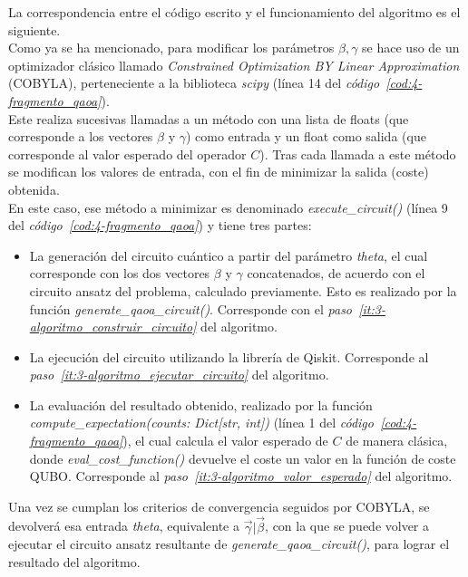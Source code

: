 La correspondencia entre el código escrito y el funcionamiento del algoritmo es el siguiente.
\\
Como ya se ha mencionado, para modificar los parámetros $\beta, \gamma$ se hace uso de un optimizador clásico llamado \textit{Constrained Optimization BY Linear Approximation} (COBYLA), perteneciente a la biblioteca \textit{scipy} (línea 14 del \textit{código~\ref{cod:4-fragmento_qaoa}}).
\\
Este realiza sucesivas llamadas a un método con una lista de floats (que corresponde a los vectores $\beta$ y $\gamma$) como entrada y un float como salida (que corresponde al valor esperado del operador $C$).
Tras cada llamada a este método se modifican los valores de entrada, con el fin de minimizar la salida (coste) obtenida.
\\
En este caso, ese método a minimizar es denominado \textit{execute\_circuit()} (línea 9 del \textit{código~\ref{cod:4-fragmento_qaoa}}) y tiene tres partes:

\begin{itemize}
\item La generación del circuito cuántico a partir del parámetro \textit{theta}, el cual corresponde con los dos vectores $\beta$ y $\gamma$ concatenados, de acuerdo con el circuito ansatz del problema, calculado previamente.
  Esto es realizado por la función \textit{generate\_qaoa\_circuit()}.
  Corresponde con el \textit{paso~\ref{it:3-algoritmo_construir_circuito}} del algoritmo.

\item La ejecución del circuito utilizando la librería de Qiskit.
    Corresponde al \textit{paso~\ref{it:3-algoritmo_ejecutar_circuito}} del algoritmo.

\item La evaluación del resultado obtenido, realizado por la función \textit{compute\_expectation(counts: Dict[str, int])} (línea 1 del \textit{código~\ref{cod:4-fragmento_qaoa}}), el cual calcula el valor esperado de $C$ de manera clásica, donde \textit{eval\_cost\_function()} devuelve el coste un valor en la función de coste QUBO\@.
  Corresponde al \textit{paso~\ref{it:3-algoritmo_valor_esperado}} del algoritmo.
\end{itemize}

Una vez se cumplan los criterios de convergencia seguidos por COBYLA, se devolverá esa entrada \textit{theta}, equivalente a $\vec{\gamma} | \vec{\beta}$, con la que se puede volver a ejecutar el circuito ansatz resultante de \textit{generate\_qaoa\_circuit()}, para lograr el resultado del algoritmo.


